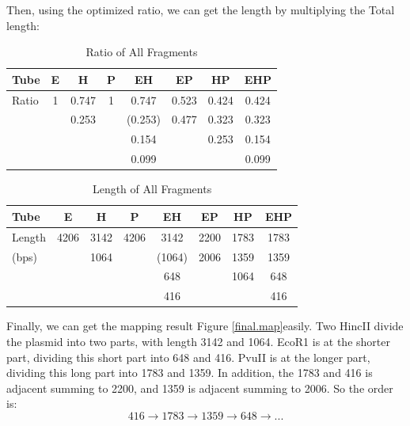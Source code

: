 \documentclass{article}
\begin{document}
            Then, using the optimized ratio, we can get the length by multiplying the Total length:
            \begin{table}[H]
                \caption{Ratio of All Fragments}
                \centering
                \begin{tabular}{|l|c|c|c|c|c|c|c|}
                    \hline
                    Tube&E&H&P&EH&EP&HP&EHP\\
                    \hline
                    Ratio&1&0.747&1&0.747&0.523&0.424&0.424\\
                    &&0.253&&(0.253)&0.477&0.323&0.323\\
                    &&&&0.154&&0.253&0.154\\
                    &&&&0.099&&&0.099\\
                    \hline
                \end{tabular}
                \label{data.ratio.final}
            \end{table}
            \begin{table}[H]
                \caption{Length of All Fragments}
                \centering
                \begin{tabular}{|l|c|c|c|c|c|c|c|}
                    \hline
                    Tube&E&H&P&EH&EP&HP&EHP\\
                    \hline
                    Length&4206&3142&4206&3142&2200&1783&1783\\
                    (bps)&&1064&&(1064)&2006&1359&1359\\
                    &&&&648&&1064&648\\
                    &&&&416&&&416\\
                    \hline
                \end{tabular}
                \label{data.length.final}
            \end{table}

            Finally, we can get the mapping result Figure \ref{final.map}easily. Two HincII divide the plasmid into two parts, with length 3142 and 1064. EcoR1 is at the shorter part, dividing this short part into 648 and 416. PvuII is at the longer part, dividing this long part into 1783 and 1359. In addition, the 1783 and 416 is adjacent summing to 2200, and 1359 is adjacent summing to 2006. So the order is:
            $$416\rightarrow1783\rightarrow1359\rightarrow648\rightarrow...$$
\end{document}
